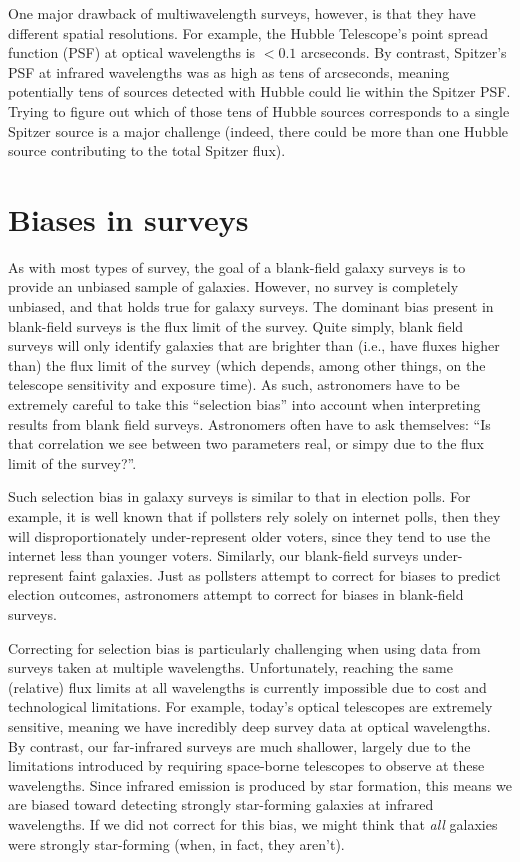 \documentclass[11pt]{article}
\begin{document}
One major drawback of multiwavelength surveys, however, is that they
have different spatial resolutions. For example, the Hubble
Telescope's point spread function (PSF) at optical wavelengths is
$<0.1$ arcseconds. By contrast, Spitzer's PSF at infrared wavelengths
was as high as tens of arcseconds, meaning potentially tens of sources
detected with Hubble could lie within the Spitzer PSF. Trying to
figure out which of those tens of Hubble sources corresponds to a
single Spitzer source is a major challenge (indeed, there could be
more than one Hubble source contributing to the total Spitzer flux).

\section{Biases in surveys}
As with most types of survey, the goal of a blank-field galaxy surveys
is to provide an unbiased sample of galaxies. However, no survey is
completely unbiased, and that holds true for galaxy surveys. The
dominant bias present in blank-field surveys is the flux limit of the
survey. Quite simply, blank field surveys will only identify galaxies
that are brighter than (i.e., have fluxes higher than) the flux limit
of the survey (which depends, among other things, on the telescope
sensitivity and exposure time). As such, astronomers have to be
extremely careful to take this ``selection bias'' into account when
interpreting results from blank field surveys. Astronomers often have
to ask themselves: ``Is that correlation we see between two parameters
real, or simpy due to the flux limit of the survey?''.

Such selection bias in galaxy surveys is similar to that in election
polls. For example, it is well known that if pollsters rely solely on
internet polls, then they will disproportionately under-represent
older voters, since they tend to use the internet less than younger
voters. Similarly, our blank-field surveys under-represent faint
galaxies. Just as pollsters attempt to correct for biases to predict
election outcomes, astronomers attempt to correct for biases in
blank-field surveys.

Correcting for selection bias is particularly challenging when using
data from surveys taken at multiple wavelengths. Unfortunately,
reaching the same (relative) flux limits at all wavelengths is
currently impossible due to cost and technological limitations. For
example, today's optical telescopes are extremely sensitive, meaning we
have incredibly deep survey data at optical wavelengths. By contrast,
our far-infrared surveys are much shallower, largely due to the
limitations introduced by requiring space-borne telescopes to observe
at these wavelengths. Since infrared emission is produced by star
formation, this means we are biased toward detecting strongly
star-forming galaxies at infrared wavelengths. If we did not correct
for this bias, we might think that {\it all} galaxies were strongly
star-forming (when, in fact, they aren't).
\end{document}
